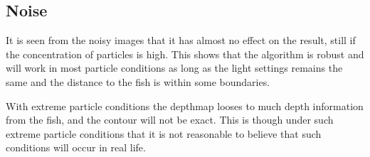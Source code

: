 \subsection{Noise}

It is seen from the noisy images that it has almost no effect on the result, still if the concentration of particles is high. This shows that the algorithm is robust and will work in most particle conditions as long as the light settings remains the same and the distance to the fish is within some boundaries.

With extreme particle conditions the depthmap looses to much depth information from the fish, and the contour will not be exact. This is though under such extreme particle conditions that it is not reasonable to believe that such conditions will occur in real life.

